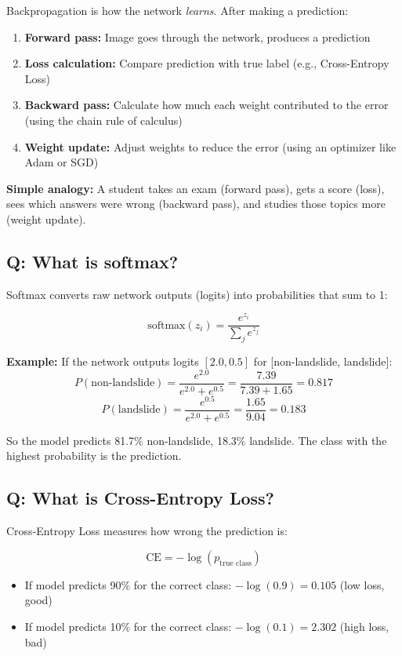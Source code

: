 \documentclass[11pt]{article}
\begin{document}
Backpropagation is how the network \textit{learns}. After making a prediction:

\begin{enumerate}[noitemsep]
    \item \textbf{Forward pass:} Image goes through the network, produces a prediction
    \item \textbf{Loss calculation:} Compare prediction with true label (e.g., Cross-Entropy Loss)
    \item \textbf{Backward pass:} Calculate how much each weight contributed to the error (using the chain rule of calculus)
    \item \textbf{Weight update:} Adjust weights to reduce the error (using an optimizer like Adam or SGD)
\end{enumerate}

\textbf{Simple analogy:} A student takes an exam (forward pass), gets a score (loss), sees which answers were wrong (backward pass), and studies those topics more (weight update).

\subsection{Q: What is softmax?}

Softmax converts raw network outputs (logits) into probabilities that sum to 1:

\[
\text{softmax}(z_i) = \frac{e^{z_i}}{\sum_j e^{z_j}}
\]

\textbf{Example:} If the network outputs logits $[2.0, 0.5]$ for [non-landslide, landslide]:
\[
P(\text{non-landslide}) = \frac{e^{2.0}}{e^{2.0} + e^{0.5}} = \frac{7.39}{7.39 + 1.65} = 0.817
\]
\[
P(\text{landslide}) = \frac{e^{0.5}}{e^{2.0} + e^{0.5}} = \frac{1.65}{9.04} = 0.183
\]

So the model predicts 81.7\% non-landslide, 18.3\% landslide. The class with the highest probability is the prediction.

\subsection{Q: What is Cross-Entropy Loss?}

Cross-Entropy Loss measures how wrong the prediction is:

\[
\text{CE} = -\log(p_{\text{true class}})
\]

\begin{itemize}[noitemsep]
    \item If model predicts 90\% for the correct class: $-\log(0.9) = 0.105$ (low loss, good)
    \item If model predicts 10\% for the correct class: $-\log(0.1) = 2.302$ (high loss, bad)
\end{itemize}
\end{document}
